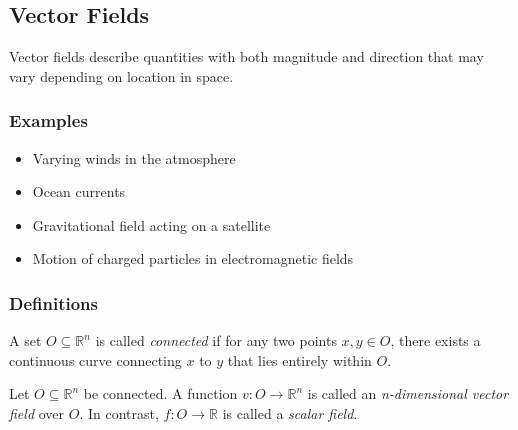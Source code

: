 \documentclass{article}
\begin{document}
\subsection{Vector Fields}
Vector fields describe quantities with both magnitude and direction that may vary depending on location in space.

\subsubsection{Examples}
\begin{itemize}
    \item Varying winds in the atmosphere
    \item Ocean currents
    \item Gravitational field acting on a satellite
    \item Motion of charged particles in electromagnetic fields
\end{itemize}

\subsubsection{Definitions}
A set \( O \subseteq \mathbb{R}^n \) is called \textit{connected} if for any two points \( x, y \in O \), there exists a continuous curve connecting \( x \) to \( y \) that lies entirely within \( O \).

Let \( O \subseteq \mathbb{R}^n \) be connected. A function \( v : O \to \mathbb{R}^n \) is called an \textit{n-dimensional vector field} over \( O \). In contrast, \( f : O \to \mathbb{R} \) is called a \textit{scalar field}.
\end{document}
